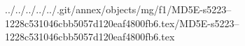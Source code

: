 ../../../../../.git/annex/objects/mg/f1/MD5E-s5223--1228c531046cbb5057d120eaf4800fb6.tex/MD5E-s5223--1228c531046cbb5057d120eaf4800fb6.tex